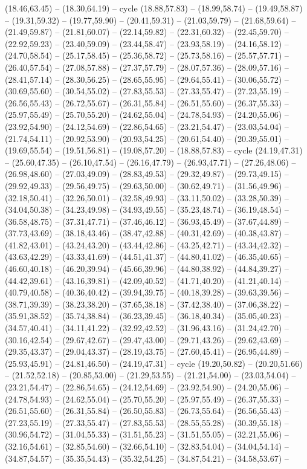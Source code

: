 {(18.46,63.45) -- (18.30,64.19) -- cycle (18.88,57.83) -- (18.99,58.74) -- (19.49,58.87) -- (19.31,59.32) -- (19.77,59.90) -- (20.41,59.31) -- (21.03,59.79) -- (21.68,59.64) -- (21.49,59.87) -- (21.81,60.07) -- (22.14,59.82) -- (22.31,60.32) -- (22.45,59.70) -- (22.92,59.23) -- (23.40,59.09) -- (23.44,58.47) -- (23.93,58.19) -- (24.16,58.12) -- (24.70,58.54) -- (25.17,58.45) -- (25.36,58.72) -- (25.73,58.16) -- (25.57,57.71) -- (26.40,57.54) -- (27.08,57.88) -- (27.37,57.79) -- (28.07,57.36) -- (28.09,57.16) -- (28.41,57.14) -- (28.30,56.25) -- (28.65,55.95) -- (29.64,55.41) -- (30.06,55.72) -- (30.69,55.60) -- (30.54,55.02) -- (27.83,55.53) -- (27.33,55.47) -- (27.23,55.19) -- (26.56,55.43) -- (26.72,55.67) -- (26.31,55.84) -- (26.51,55.60) -- (26.37,55.33) -- (25.97,55.49) -- (25.70,55.20) -- (24.62,55.04) -- (24.78,54.93) -- (24.20,55.06) -- (23.92,54.90) -- (24.12,54.69) -- (22.86,54.65) -- (23.21,54.47) -- (23.03,54.04) -- (21.74,54.11) -- (20.92,53.90) -- (20.93,54.25) -- (20.61,54.40) -- (20.39,55.01) -- (19.69,55.54) -- (19.51,56.81) -- (19.08,57.20) -- (18.88,57.83) -- cycle (24.19,47.31) -- (25.60,47.35) -- (26.10,47.54) -- (26.16,47.79) -- (26.93,47.71) -- (27.26,48.06) -- (26.98,48.60) -- (27.03,49.09) -- (28.83,49.53) -- (29.32,49.87) -- (29.73,49.15) -- (29.92,49.33) -- (29.56,49.75) -- (29.63,50.00) -- (30.62,49.71) -- (31.56,49.96) -- (32.18,50.41) -- (32.26,50.01) -- (32.58,49.93) -- (33.11,50.02) -- (33.28,50.39) -- (34.04,50.38) -- (34.23,49.98) -- (34.93,49.55) -- (35.23,48.74) -- (36.19,48.54) -- (36.58,48.75) -- (37.31,47.71) -- (37.46,46.12) -- (36.93,45.49) -- (37.67,44.89) -- (37.73,43.69) -- (38.18,43.46) -- (38.47,42.88) -- (40.31,42.69) -- (40.38,43.87) -- (41.82,43.01) -- (43.24,43.20) -- (43.44,42.86) -- (43.25,42.71) -- (43.34,42.32) -- (43.63,42.29) -- (43.33,41.69) -- (44.51,41.37) -- (44.80,41.02) -- (46.35,40.65) -- (46.60,40.18) -- (46.20,39.94) -- (45.66,39.96) -- (44.80,38.92) -- (44.84,39.27) -- (44.42,39.61) -- (43.16,39.81) -- (42.09,40.52) -- (41.71,40.20) -- (41.21,40.14) -- (40.79,40.58) -- (40.36,40.42) -- (39.94,39.75) -- (40.18,39.28) -- (39.63,39.56) -- (38.71,39.39) -- (38.23,38.20) -- (37.65,38.18) -- (37.42,38.40) -- (37.06,38.22) -- (35.91,38.52) -- (35.74,38.84) -- (36.23,39.45) -- (36.18,40.34) -- (35.05,40.23) -- (34.57,40.41) -- (34.11,41.22) -- (32.92,42.52) -- (31.96,43.16) -- (31.24,42.70) -- (30.16,42.54) -- (29.67,42.67) -- (29.47,43.00) -- (29.71,43.26) -- (29.62,43.69) -- (29.35,43.37) -- (29.04,43.37) -- (28.19,43.75) -- (27.60,45.41) -- (26.95,44.89) -- (25.93,45.91) -- (24.81,46.50) -- (24.19,47.31) -- cycle (19.20,50.82) -- (20.20,51.66) -- (21.52,52.18) -- (20.85,53.00) -- (21.29,53.55) -- (21.21,54.00) -- (23.03,54.04) -- (23.21,54.47) -- (22.86,54.65) -- (24.12,54.69) -- (23.92,54.90) -- (24.20,55.06) -- (24.78,54.93) -- (24.62,55.04) -- (25.70,55.20) -- (25.97,55.49) -- (26.37,55.33) -- (26.51,55.60) -- (26.31,55.84) -- (26.50,55.83) -- (26.73,55.64) -- (26.56,55.43) -- (27.23,55.19) -- (27.33,55.47) -- (27.83,55.53) -- (28.55,55.28) -- (30.39,55.18) -- (30.96,54.72) -- (31.04,55.33) -- (31.51,55.23) -- (31.51,55.05) -- (32.21,55.06) -- (32.16,54.61) -- (32.85,54.60) -- (32.66,54.10) -- (32.83,54.04) -- (34.04,54.14) -- (34.87,54.57) -- (35.35,54.43) -- (35.32,54.25) -- (34.87,54.21) -- (34.58,53.67) -- }
